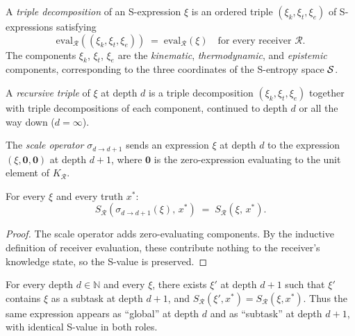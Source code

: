 \begin{definition}
\label{def:triple-decomp}
A \emph{triple decomposition} of an S-expression $\xi$ is an ordered triple
$(\xi_k, \xi_t, \xi_e)$ of S-expressions satisfying
\[
  \mathrm{eval}_{\mathcal{R}}((\xi_k, \xi_t, \xi_e))
  \;=\; \mathrm{eval}_{\mathcal{R}}(\xi)
  \quad \text{for every receiver } \mathcal{R}.
\]
The components $\xi_k$, $\xi_t$, $\xi_e$ are the \emph{kinematic},
\emph{thermodynamic}, and \emph{epistemic} components, corresponding to
the three coordinates of the S-entropy space $\mathcal{S}$.
\end{definition}

\begin{definition}
\label{def:rec-triple}
A \emph{recursive triple} of $\xi$ at depth $d$ is a triple decomposition
$(\xi_k, \xi_t, \xi_e)$ together with triple decompositions of each
component, continued to depth $d$ or all the way down ($d = \infty$).
\end{definition}

\begin{definition}
\label{def:scale-op}
The \emph{scale operator} $\sigma_{d \to d+1}$ sends an expression $\xi$ at
depth $d$ to the expression $(\xi, \mathbf{0}, \mathbf{0})$ at depth $d+1$,
where $\mathbf{0}$ is the zero-expression evaluating to the unit element of
$K_{\mathcal{R}}$.
\end{definition}

\begin{theorem}
\label{thm:scale-inv}
For every $\xi$ and every truth $x^*$:
\[
  S_{\mathcal{R}}(\sigma_{d \to d+1}(\xi),\, x^*)
  \;=\; S_{\mathcal{R}}(\xi,\, x^*) .
\]
\end{theorem}

\begin{proof}
The scale operator adds zero-evaluating components.  By the inductive
definition of receiver evaluation, these contribute nothing to the
receiver's knowledge state, so the S-value is preserved.
\end{proof}

\begin{theorem}
\label{thm:no-priv-level}
For every depth $d \in \mathbb{N}$ and every $\xi$, there exists $\xi'$ at
depth $d+1$ such that $\xi'$ contains $\xi$ as a subtask at depth $d+1$,
and $S_{\mathcal{R}}(\xi', x^*) = S_{\mathcal{R}}(\xi, x^*)$.  Thus the
same expression appears as ``global'' at depth $d$ and as ``subtask'' at
depth $d+1$, with identical S-value in both roles.
\end{theorem}

